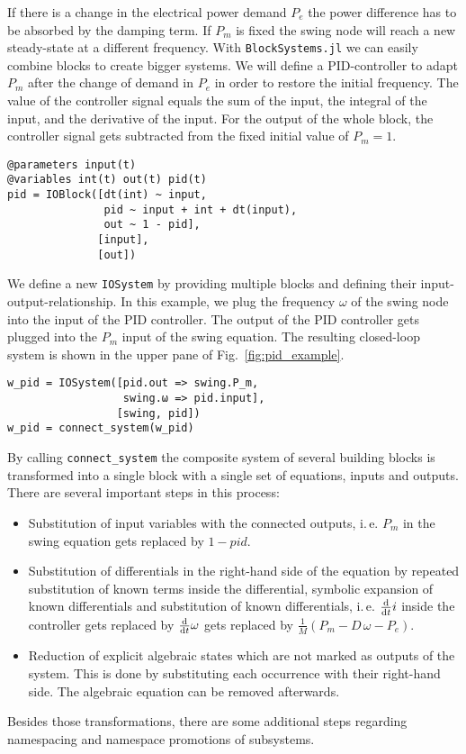 \documentclass[conference]{IEEEtran}
\begin{document}
If there is a change in the electrical power demand $P_e$ the power difference has to be absorbed by the damping term. If $P_m$ is fixed the swing node will reach a new steady-state at a different frequency. With \texttt{BlockSystems.jl} we can easily combine blocks to create bigger systems. We will define a PID-controller to adapt $P_m$ after the change of demand in $P_e$ in order to restore the initial frequency. The value of the controller signal equals the sum of the input, the integral of the input, and the derivative of the input. For the output of the whole block, the controller signal gets subtracted from the fixed initial value of $P_m = 1$.

\begin{verbatim}
@parameters input(t)
@variables int(t) out(t) pid(t)
pid = IOBlock([dt(int) ~ input,
               pid ~ input + int + dt(input),
               out ~ 1 - pid],
              [input],
              [out])
\end{verbatim}

We define a new \texttt{IOSystem} by providing multiple blocks and defining their input-output-relationship.
In this example, we plug the frequency $\omega$ of the swing node into the input of the PID controller.
The output of the PID controller gets plugged into the $P_m$ input of the swing equation.
The resulting closed-loop system is shown in the upper pane of Fig.~\ref{fig:pid_example}.

\begin{verbatim}
w_pid = IOSystem([pid.out => swing.P_m,
                  swing.ω => pid.input],
                 [swing, pid])
w_pid = connect_system(w_pid)
\end{verbatim}

By calling \texttt{connect\_system} the composite system of several building blocks is transformed into a single block with a single set of equations, inputs and outputs.
There are several important steps in this process:
\begin{itemize}
    \item Substitution of input variables with the connected outputs, i.\,e. $P_m$ in the swing equation gets replaced by $1 - pid$.
    \item Substitution of differentials in the right-hand side of the equation by repeated substitution of known terms inside the differential, symbolic expansion of known differentials and substitution of known differentials, i.\,e. $\dv{t}i$ inside the controller gets replaced by $\dv{t}\omega$ gets replaced by $\frac{1}{M}(P_m - D\,\omega - P_e)$.
    \item Reduction of explicit algebraic states which are not marked as outputs of the system. This is done by substituting each occurrence with their right-hand side. The algebraic equation can be removed afterwards.
\end{itemize}
Besides those transformations, there are some additional steps regarding namespacing and namespace promotions of subsystems.
\end{document}
